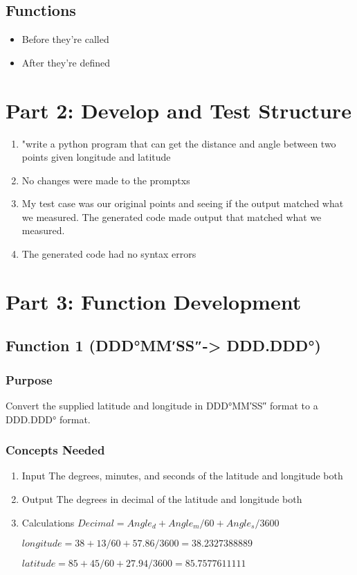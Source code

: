\documentclass[11pt]{article}
\begin{document}
\subsection{Functions}
\label{sec:org38f350f}
\begin{itemize}
\item Before they're called
\item After they're defined
\end{itemize}

\section{Part 2: Develop and Test Structure}
\label{sec:orga00df4d}
\begin{enumerate}
\item "write a python program that can get the distance and angle between two
points given longitude and latitude
\item No changes were made to the promptxs
\item My test case was our original points and seeing if the output matched what we
measured. The generated code made output that matched what we measured.
\item The generated code had no syntax errors
\end{enumerate}

\section{Part 3: Function Development}
\label{sec:org1fe3012}
\subsection{Function 1 (DDD°MM′SS″-> DDD.DDD°)}
\label{sec:org9e031f2}
\subsubsection{Purpose}
\label{sec:org2640c33}
Convert the supplied latitude and longitude in DDD°MM′SS″ format to a DDD.DDD° format.

\subsubsection{Concepts Needed}
\label{sec:org3a8c81d}
\begin{enumerate}
\item Input
\label{sec:org6b10d6e}
The degrees, minutes, and seconds of the latitude and longitude both

\item Output
\label{sec:org76c54e8}
The degrees in decimal of the latitude and longitude both

\item Calculations
\label{sec:org39da4bc}
\(Decimal = Angle_d + Angle_m / 60 + Angle_s / 3600\)

\(longitude = 38 + 13 / 60 + 57.86 / 3600 = 38.2327388889\)

\(latitude = 85 + 45 / 60 + 27.94 / 3600 = 85.7577611111\)
\end{enumerate}
\end{document}
